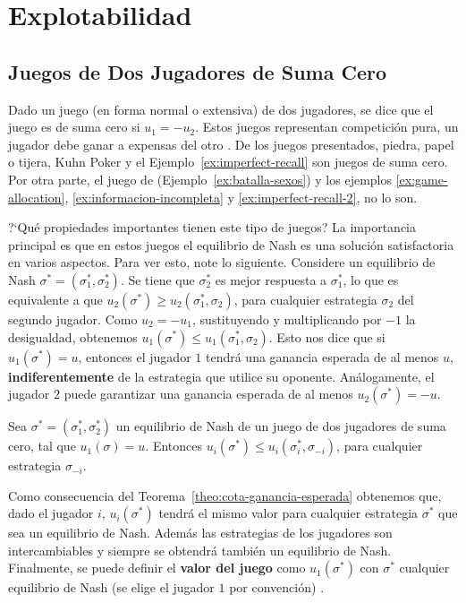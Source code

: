 \chapter{Explotabilidad}
\label{chapter:explotabilidad}

\section{Juegos de Dos Jugadores de Suma Cero}
\label{section:dos-jugadores-suma-cero}
Dado un juego (en forma normal o extensiva) de dos jugadores, se dice que el juego es de suma cero si $u_1 = -u_2$. Estos juegos representan competición pura, un jugador debe ganar a expensas del otro \cite[p.~5]{bib:handbook-blai}. De los juegos presentados, piedra, papel o tijera, Kuhn Poker y el Ejemplo~\ref{ex:imperfect-recall} son juegos de suma cero. Por otra parte, el juego de  (Ejemplo~\ref{ex:batalla-sexos}) y los  ejemplos \ref{ex:game-allocation}, \ref{ex:informacion-incompleta} y \ref{ex:imperfect-recall-2}, no lo son.

?`Qué propiedades importantes tienen este tipo de juegos? La importancia principal es que en estos juegos el equilibrio de Nash es una solución satisfactoria en varios aspectos. Para ver esto, note lo siguiente. Considere un equilibrio de Nash $\sigma^* = (\sigma^*_1, \sigma^*_2)$. Se tiene que $\sigma^*_2$ es mejor respuesta a $\sigma^*_1$, lo que es equivalente a que $u_2(\sigma^*) \geq u_2(\sigma^*_1, \sigma_2)$, para cualquier estrategia $\sigma_2$ del segundo jugador. Como $u_2 = -u_1$, sustituyendo y multiplicando por $-1$ la desigualdad, obtenemos $u_1(\sigma^*) \leq u_1(\sigma^*_1, \sigma_2)$. Esto nos dice que si $u_1(\sigma^*) = u$, entonces el jugador $1$ tendrá una ganancia esperada de al menos $u$, \textbf{indiferentemente} de la estrategia que utilice su oponente. Análogamente, el jugador $2$ puede garantizar una ganancia esperada de al menos $u_2(\sigma^*) = -u$.

\begin{theorem}
\label{theo:cota-ganancia-esperada}
Sea $\sigma^* = (\sigma^*_1, \sigma^*_2)$ un equilibrio de Nash de un juego de dos jugadores de suma cero, tal que $u_1(\sigma) = u$. Entonces $u_i(\sigma^*) \leq u_i(\sigma^*_i, \sigma_{-i})$, para cualquier estrategia $\sigma_{-i}$.  
\end{theorem}

Como consecuencia del Teorema~\ref{theo:cota-ganancia-esperada} obtenemos que, dado el jugador $i$, $u_i(\sigma^*)$ tendrá el mismo valor para cualquier estrategia $\sigma^*$ que sea un equilibrio de Nash. Además las estrategias de los jugadores son intercambiables y siempre se obtendrá también un equilibrio de Nash. Finalmente, se puede definir el \textbf{valor del juego} como $u_1(\sigma^*)$ con $\sigma^*$ cualquier equilibrio de Nash (se elige el jugador $1$ por convención) \cite[p.~17]{bib:handbook-blai}.

